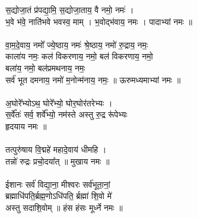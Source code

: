 \subsection{}
\\
स॒द्योजा॒तं प्र॑पद्या॒मि॒ स॒द्योजा॒ताय॒ वै नमो॒ नमः॑ ।\\
भ॒वे भ॑वे॒ नाति॑भवे भवस्व॒ माम् । भ॒वोद्भ॑वाय॒ नमः । पादाभ्यां नमः ॥\\
\\
वा॒म॒दे॒वाय॒ नमो᳚ ज्ये॒ष्ठाय॒ नमः॑  श्रे॒ष्ठाय॒ नमो॑ रु॒द्राय॒ नमः॒ \\
काला॑य नमः॒ कल॑ विकरणाय॒ नमो॒  बल॑ विकरणाय॒ नमो॒\\
बला॑य॒ नमो॒ बल॑प्रमथनाय॒ नमः॒ \\
सर्व॑ भूत दमनाय॒ नमो॑ म॒नोन्म॑नाय॒ नमः॒ ॥ ऊरुमध्यमाभ्यां नमः ॥\\
\\
अ॒घोरे᳚भ्योऽथ॒ घोरे᳚भ्यो॒ घोर॒घोर॑तरेभ्यः । \\
स॒र्वे᳚तः॑ सर्व॒ शर्वे᳚भ्यो॒ नम॑स्ते अस्तु रु॒द्र रू॑पेभ्यः\\
हृदयाय नमः ॥\\
\\
तत्पुरु॑षाय वि॒द्महे॑ महादे॒वाय॑ धीमहि । \\
तन्नो॑ रुद्रः प्रचो॒दया᳚त्  ॥ मुखाय नमः ॥\\
\\
ईशानः सर्व॑ विद्या॒ना॒ मीश्वरः सर्व॑भूता॒नां॒\\
ब्रह्माधि॑पति॒र्ब्रह्म॒णोऽधि॑पति॒ र्ब्रह्मा॑ शि॒वो मे॑\\
अस्तु सदाशि॒वोम् ॥ {\small हंस हंसः} मूर्ध्ने नमः ॥\\
